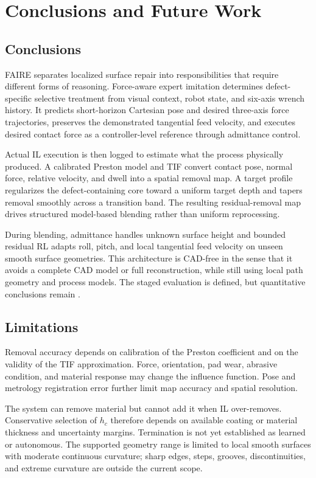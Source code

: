\chapter{Conclusions and Future Work}
\label{chap:conclusions}

\section{Conclusions}
FAIRE separates localized surface repair into responsibilities that require different forms of reasoning. Force-aware expert imitation determines defect-specific selective treatment from visual context, robot state, and six-axis wrench history. It predicts short-horizon Cartesian pose and desired three-axis force trajectories, preserves the demonstrated tangential feed velocity, and executes desired contact force as a controller-level reference through admittance control.

Actual IL execution is then logged to estimate what the process physically produced. A calibrated Preston model and TIF convert contact pose, normal force, relative velocity, and dwell into a spatial removal map. A target profile regularizes the defect-containing core toward a uniform target depth and tapers removal smoothly across a transition band. The resulting residual-removal map drives structured model-based blending rather than uniform reprocessing.

During blending, admittance handles unknown surface height and bounded residual RL adapts roll, pitch, and local tangential feed velocity on unseen smooth surface geometries. This architecture is CAD-free in the sense that it avoids a complete CAD model or full reconstruction, while still using local path geometry and process models. The staged evaluation is defined, but quantitative conclusions remain .

\section{Limitations}
Removal accuracy depends on calibration of the Preston coefficient and on the validity of the TIF approximation. Force, orientation, pad wear, abrasive condition, and material response may change the influence function. Pose and metrology registration error further limit map accuracy and spatial resolution.

The system can remove material but cannot add it when IL over-removes. Conservative selection of \(h_c\) therefore depends on available coating or material thickness and uncertainty margins. Termination is not yet established as learned or autonomous. The supported geometry range is limited to local smooth surfaces with moderate continuous curvature; sharp edges, steps, grooves, discontinuities, and extreme curvature are outside the current scope.


